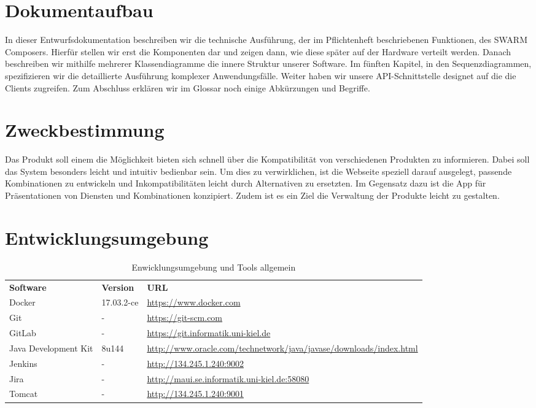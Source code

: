 \section{Dokumentaufbau}\label{sec:dokumentaufbau}
In dieser Entwurfsdokumentation beschreiben wir die technische Ausführung, der im Pflichtenheft beschriebenen Funktionen, des SWARM Composers. Hierfür stellen wir erst die Komponenten dar und zeigen dann, wie diese später auf der Hardware verteilt werden.
Danach beschreiben wir mithilfe mehrerer Klassendiagramme die innere Struktur unserer Software.
Im fünften Kapitel, in den Sequenzdiagrammen, spezifizieren wir die detaillierte Ausführung komplexer Anwendungsfälle.
Weiter haben wir unsere API-Schnittstelle designet auf die die Clients zugreifen.
Zum Abschluss erklären wir im Glossar noch einige Abkürzungen und Begriffe.

\section{Zweckbestimmung}\label{sec:zweckbestimmung}
Das Produkt soll einem die Möglichkeit bieten sich schnell über die Kompatibilität von verschiedenen Produkten zu informieren.
Dabei soll das System besonders leicht und intuitiv bedienbar sein.
Um dies zu verwirklichen, ist die Webseite speziell darauf ausgelegt, passende Kombinationen zu entwickeln und Inkompatibilitäten leicht durch Alternativen zu ersetzten.
Im Gegensatz dazu ist die App für Präsentationen von Diensten und Kombinationen konzipiert.
Zudem ist es ein Ziel die Verwaltung der Produkte leicht zu gestalten.

\section{Entwicklungsumgebung}\label{sec:entwicklungsumgebung}

\begin{table}[h]
	\centering
	\begin{tabularx}{\textwidth}{l l X}
		\rowcolor[HTML]{C0C0C0}
		\textbf{Software} & \textbf{Version} & \textbf{URL} \\
		Docker & 17.03.2-ce & \url{https://www.docker.com} \\	
		\rowcolor[HTML]{E7E7E7}
		Git & - & \url{https://git-scm.com} \\
		GitLab & - & \url{https://git.informatik.uni-kiel.de} \\	
		\rowcolor[HTML]{E7E7E7}			
		Java Development Kit & 8u144 & \url{http://www.oracle.com/technetwork/java/javase/downloads/index.html} \\
		Jenkins & - & \url{http://134.245.1.240:9002} \\		
		\rowcolor[HTML]{E7E7E7}
		Jira & - & \url{http://maui.se.informatik.uni-kiel.de:58080} \\
		Tomcat & - &  \url{http://134.245.1.240:9001} \\
	\end{tabularx}
	\caption{Enwicklungsumgebung und Tools allgemein}
	\label{table:entwicklungsumgebung-allgemein}
\end{table}

